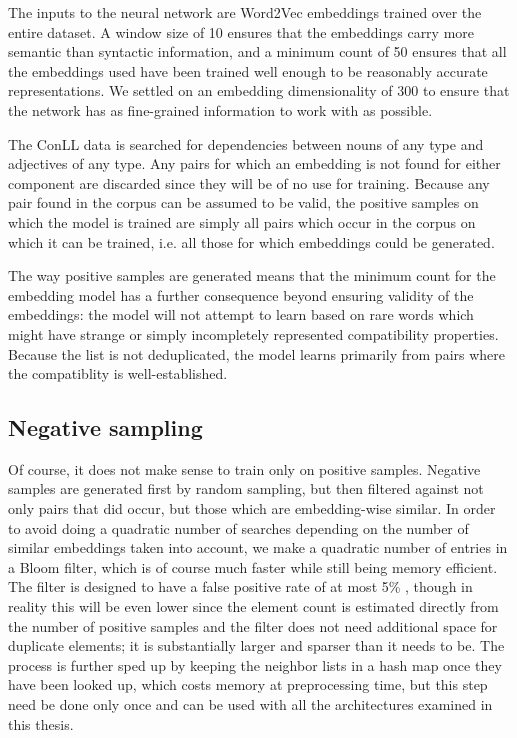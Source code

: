 \documentclass[a4paper, 12pt]{scrartcl}
\begin{document}
The inputs to the neural network are Word2Vec embeddings trained over the entire dataset. A window size of 10 ensures that the embeddings carry more semantic than syntactic information, and a minimum count of 50 ensures that all the embeddings used have been trained well enough to be reasonably accurate representations. We settled on an embedding dimensionality of 300 to ensure that the network has as fine-grained information to work with as possible.

The ConLL data is searched for dependencies between nouns of any type and adjectives of any type. Any pairs for which an embedding is not found for either component are discarded since they will be of no use for training. Because any pair found in the corpus can be assumed to be valid, the positive samples on which the model is trained are simply all pairs which occur in the corpus on which it can be trained, i.e. all those for which embeddings could be generated.

The way positive samples are generated means that the minimum count for the embedding model has a further consequence beyond ensuring validity of the embeddings: the model will not attempt to learn based on rare words which might have strange or simply incompletely represented compatibility properties. Because the list is not deduplicated, the model learns primarily from pairs where the compatiblity is well-established.

\subsection{Negative sampling}

Of course, it does not make sense to train only on positive samples. Negative samples are generated first by random sampling, but then filtered against not only pairs that did occur, but those which are embedding-wise similar. In order to avoid doing a quadratic number of searches depending on the number of similar embeddings taken into account, we make a quadratic number of entries in a Bloom filter, which is of course much faster while still being memory efficient. The filter is designed to have a false positive rate of at most 5\% , though in reality this will be even lower since the element count is estimated directly from the number of positive samples and the filter does not need additional space for duplicate elements; it is substantially larger and sparser than it needs to be. The process is further sped up by keeping the neighbor lists in a hash map once they have been looked up, which costs memory at preprocessing time, but this step need be done only once and can be used with all the architectures examined in this thesis.
\end{document}
